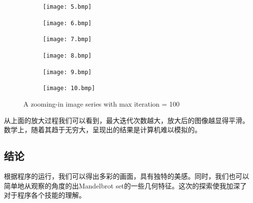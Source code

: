 \documentclass{ctexart}
\begin{document}
\begin{figure}[H]
\begin{subfigure}{0.3\textwidth}
	\centering
	\texttt{[image: 5.bmp]}
\end{subfigure}
\begin{subfigure}{0.3\textwidth}
	\centering
	\texttt{[image: 6.bmp]}
\end{subfigure}
\begin{subfigure}{0.3\textwidth}
	\centering
	\texttt{[image: 7.bmp]}
\end{subfigure}

\begin{subfigure}{0.3\textwidth}
	\centering
	\texttt{[image: 8.bmp]}
\end{subfigure}
\begin{subfigure}{0.3\textwidth}
	\centering
	\texttt{[image: 9.bmp]}
\end{subfigure}
\begin{subfigure}{0.3\textwidth}
	\centering
	\texttt{[image: 10.bmp]}
\end{subfigure}
\caption{A zooming-in image series with max iteration = 100}
\end{figure}
从上面的放大过程我们可以看到，最大迭代次数越大，放大后的图像越显得平滑。数学上，随着其趋于无穷大，呈现出的结果是计算机难以模拟的。
\subsection{结论}
根据程序的运行，我们可以得出多彩的画面，具有独特的美感。同时，我们也可以简单地从观察的角度的出Mandelbrot set的一些几何特征。这次的探索使我加深了对于程序各个技能的理解。
\end{document}

